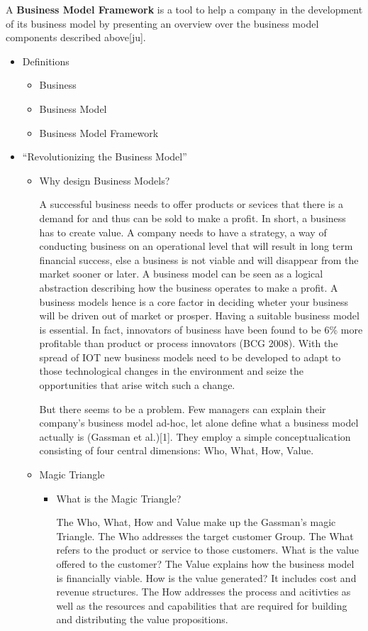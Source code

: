 	 A \textbf{Business Model Framework} is a tool to help a company in the development of its business model by presenting an overview over the business model components described above[ju].
	\begin{itemize}
		\item Definitions \cite{bmc} \cite{dijkman}
			\begin{itemize}
				\item Business 
				\item Business Model 
				\item Business Model Framework
			\end{itemize}
		\item ``Revolutionizing the Business Model'' \cite{gassmann}
			\begin{itemize}
				\item Why design Business Models?
				
				A successful business needs to offer products or sevices that there is a demand for and thus can be sold to make a profit. In short, a business has to create value. A company needs to have a strategy, a way of conducting business on an operational level that will result in long term financial success, else a business is not viable and will disappear from the market sooner or later.
				A business model can be seen as a logical abstraction describing how the business operates to make a profit. A business models hence is a core factor in deciding wheter your business will be driven out of market or prosper. Having a suitable business model is essential. In fact, innovators of business have been found to be 6\% more profitable than product or process innovators (BCG 2008). With the spread of IOT new business models need to be developed to adapt to those technological changes in the environment and seize the opportunities that arise witch such a change. 

				But there seems to be a problem. Few managers can explain their company's business model ad-hoc, let alone define what a business model actually is (Gassman et al.)[1]. They employ a simple conceptualication consisting of four central dimensions: Who, What, How, Value. 
				\item Magic Triangle 

				\begin{itemize}
					\item What is the Magic Triangle?

					The Who, What, How and Value make up the Gassman's magic Triangle. 
					The Who addresses the target customer Group. 
					The What refers to the product or service to those customers. What is the value offered to the customer? 
					The Value explains how the business model is financially viable. How is the value generated? It includes cost and revenue structures.
					The How addresses the process and acitivties as well as the resources and capabilities that are required for building and distributing the value propositions.
					

\end{itemize}
\end{itemize}
\end{itemize}
